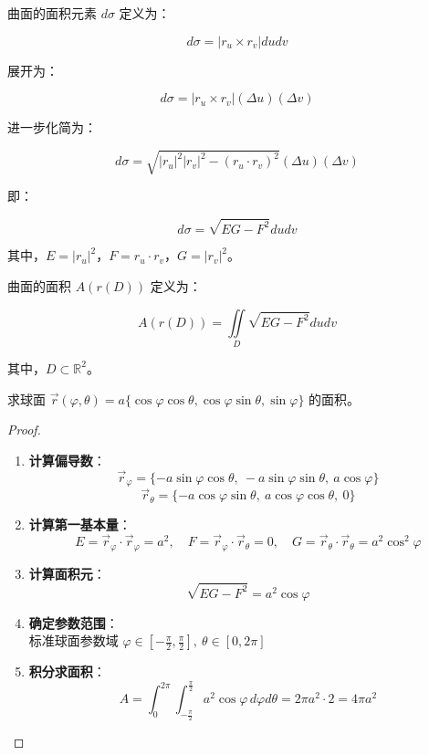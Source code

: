 \documentclass[lang=cn,10pt,thmcnt=section]{elegantbook}
\begin{document}
曲面的面积元素 $d\sigma$ 定义为：

$$
d\sigma = |r_u \times r_v| du dv
$$

展开为：

$$
d\sigma = |r_u \times r_v| (\Delta u) (\Delta v)
$$

进一步化简为：

$$
d\sigma = \sqrt{|r_u|^2 |r_v|^2 - (r_u \cdot r_v)^2} (\Delta u) (\Delta v)
$$

即：

$$
d\sigma = \sqrt{EG - F^2} du dv
$$

其中，$E = |r_u|^2$，$F = r_u \cdot r_v$，$G = |r_v|^2$。

\begin{definition}[曲面面积]
    曲面的面积 $A(r(D))$ 定义为：

    $$
    A(r(D)) = \iint\limits_{D} \sqrt{EG - F^2} du dv
    $$

    其中，$D \subset \mathbb{R}^2$。
\end{definition}
\begin{example}
	求球面 $\vec{r}(\varphi, \theta) = a \{\cos\varphi \cos\theta, \cos\varphi \sin\theta, \sin\varphi\}$ 的面积。

\end{example}
\begin{proof}
	\begin{enumerate}
		\item \textbf{计算偏导数}：
		\[
			\vec{r}_\varphi = \{-a\sin\varphi \cos\theta,\ -a\sin\varphi \sin\theta,\ a\cos\varphi\}
		\]
		\[
			\vec{r}_\theta = \{-a\cos\varphi \sin\theta,\ a\cos\varphi \cos\theta,\ 0\}
		\]
		
		\item \textbf{计算第一基本量}：
		\[
			E = \vec{r}_\varphi \cdot \vec{r}_\varphi = a^2, \quad 
			F = \vec{r}_\varphi \cdot \vec{r}_\theta = 0, \quad 
			G = \vec{r}_\theta \cdot \vec{r}_\theta = a^2\cos^2\varphi
		\]
		
		\item \textbf{计算面积元}：
		\[
			\sqrt{EG - F^2} = a^2\cos\varphi
		\]
		
		\item \textbf{确定参数范围}：\\
		标准球面参数域 $\varphi \in [-\frac{\pi}{2}, \frac{\pi}{2}],\ \theta \in [0, 2\pi]$
		
		\item \textbf{积分求面积}：
		\[
			A = \int_{0}^{2\pi} \int_{-\frac{\pi}{2}}^{\frac{\pi}{2}} a^2\cos\varphi \, d\varphi d\theta = 2\pi a^2 \cdot 2 = \boxed{4\pi a^2}
		\]
	\end{enumerate}
\end{proof}
\end{document}
